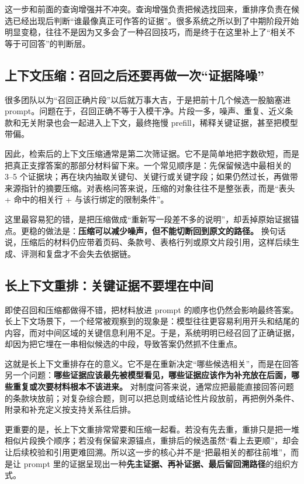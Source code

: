 这一步和前面的查询增强并不冲突。查询增强负责把候选找回来，重排序负责在候选已经出现后判断“谁最像真正可作答的证据”。很多系统之所以到了中期阶段开始明显变稳，往往不是因为又多会了一种召回技巧，而是终于在这里补上了“相关不等于可回答”的判断层。

\subsection{上下文压缩：召回之后还要再做一次“证据降噪”}
很多团队以为“召回正确片段”以后就万事大吉，于是把前十几个候选一股脑塞进 prompt。问题在于，召回正确不等于入模干净。片段一多，噪声、重复、近义条款和无关附录也会一起进入上下文，最终拖慢 prefill，稀释关键证据，甚至把模型带偏。

因此，检索后的上下文压缩通常是第二次筛证据。它不是简单地把字数砍短，而是把真正支撑答案的那部分材料留下来。一个常见顺序是：先保留候选中最相关的 3--5 个证据块；再在块内抽取关键句、关键行或关键字段；如果仍然过长，再做带来源指针的摘要压缩。对表格问答来说，压缩的对象往往不是整张表，而是“表头 + 命中的相关行 + 与该行绑定的限制条件”。

这里最容易犯的错，是把压缩做成“重新写一段差不多的说明”，却丢掉原始证据锚点。更稳的做法是：\textbf{压缩可以减少噪声，但不能切断回到原文的路径。} 换句话说，压缩后的材料仍应带着页码、条款号、表格行列或原文片段引用，这样后续生成、评测和复盘才不会失去依据链。

\subsection{长上下文重排：关键证据不要埋在中间}
即使召回和压缩都做得不错，把材料放进 prompt 的顺序也仍然会影响最终答案。长上下文场景下，一个经常被观察到的现象是：模型往往更容易利用开头和结尾的内容，而对中间区域的关键信息利用不足。于是，系统明明已经召回了正确证据，却因为把它埋在一串相似候选的中段，导致答案仍然抓不住重点。

这就是长上下文重排存在的意义。它不是在重新决定“哪些候选相关”，而是在回答另一个问题：\textbf{哪些证据应该最先被模型看见，哪些证据应该作为补充放在后面，哪些重复或次要材料根本不该进来。} 对制度问答来说，通常应把最能直接回答问题的条款块放前；对复杂综合题，则可以把总则或结论性片段放前，再把例外条件、附录和补充定义按支持关系往后排。

更重要的是，长上下文重排常常要和压缩一起看。若没有先去重，重排只是把一堆相似片段换个顺序；若没有保留来源锚点，重排后的候选虽然“看上去更顺”，却会让后续校验和引用更难回溯。所以这一步的核心并不是“把最相关的都往前堆”，而是让 prompt 里的证据呈现出一种\textbf{先主证据、再补证据、最后留回溯路径}的组织方式。

